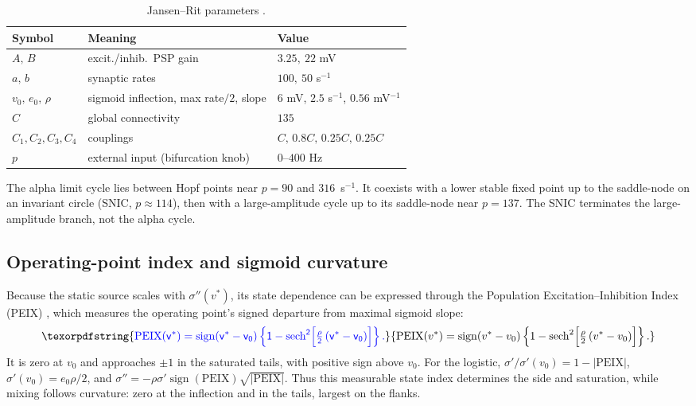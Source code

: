 \documentclass[11pt,a4paper]{article}
\newcommand{\Sig}{\sigma}
\providecommand{\DIFaddtex}[1]{{\protect\color{blue} \sf #1}} %
\providecommand{\DIFadd}[1]{\texorpdfstring{\DIFaddtex{#1}}{#1}} %
\begin{document}
\begin{table}[h]
\color{blue}\centering\small
\caption{\color{blue}Jansen--Rit parameters \cite{jansen1995}.}
\label{tab:params}
\begin{tabular}{@{}lll@{}}
\toprule
Symbol & Meaning & Value\\
\midrule
$A,\,B$ & excit./inhib.\ PSP gain & $3.25,\ 22$ mV\\
$a,\,b$ & synaptic rates & $100,\ 50$ s$^{-1}$\\
$v_0,\,e_0,\,\rho$ & sigmoid inflection, max rate$/2$, slope & $6$ mV, $2.5$ s$^{-1}$, $0.56$ mV$^{-1}$\\
$C$ & global connectivity & $135$\\
$C_1,C_2,C_3,C_4$ & couplings & $C,\,0.8C,\,0.25C,\,0.25C$\\
$p$ & external input (bifurcation knob) & $0$--$400$ Hz\\
\bottomrule
\end{tabular}
\end{table}

\DIFadd{The alpha limit cycle lies between Hopf points near $p=90$ and
$316$~s$^{-1}$. It coexists with a lower stable fixed point up to the
saddle-node on an invariant circle (SNIC, $p\approx114$), then with a
large-amplitude cycle up to its saddle-node near $p=137$. The SNIC
terminates the large-amplitude branch, not the alpha cycle.
}


\subsection{\DIFadd{Operating-point index and sigmoid curvature}}\label{app:peix}
\DIFadd{Because the static source scales with $\Sig''(v^*)$, its state dependence
can be expressed through the Population Excitation--Inhibition Index (PEIX)
\cite{ruffini2025cfc}, which measures the operating point's signed departure from maximal sigmoid slope:
}\begin{equation}
\DIFadd{\mathrm{PEIX}(v^*)=\operatorname{sign}(v^*-v_0)
\left\{1-\operatorname{sech}^2\!\Big[\tfrac{\rho}{2}\,(v^*-v_0)\Big]\right\}.
\label{eq:peix}
}\end{equation}
\DIFadd{It is zero at $v_0$ and approaches $\pm1$ in the saturated tails, with
positive sign above $v_0$. For the logistic,
$\Sig'/\Sig'(v_0)=1-|\mathrm{PEIX}|$, $\Sig'(v_0)=e_0\rho/2$, and
$\Sig''=-\rho\Sig'\operatorname{sign}(\mathrm{PEIX})\sqrt{|\mathrm{PEIX}|}$.
Thus this measurable state index determines the side and saturation, while
mixing follows curvature: zero at the inflection and in the tails, largest
on the flanks.
}
\end{document}
